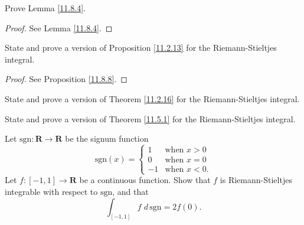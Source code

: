 \exercisesection

\begin{exercise}\label{ex 11.8.1}
    Prove Lemma \ref{11.8.4}.
\end{exercise}

\begin{proof}
    See Lemma \ref{11.8.4}.
\end{proof}

\begin{exercise}\label{ex 11.8.2}
    State and prove a version of Proposition \ref{11.2.13} for the Riemann-Stieltjes integral.
\end{exercise}

\begin{proof}
    See Proposition \ref{11.8.8}.
\end{proof}

\begin{exercise}\label{ex 11.8.3}
    State and prove a version of Theorem \ref{11.2.16} for the Riemann-Stieltjes integral.
\end{exercise}

\begin{exercise}\label{ex 11.8.4}
    State and prove a version of Theorem \ref{11.5.1} for the Riemann-Stieltjes integral.
\end{exercise}

\begin{exercise}\label{ex 11.8.5}
    Let \(\text{sgn} : \mathbf{R} \to \mathbf{R}\) be the signum function
    \[
        \text{sgn}(x) = \begin{cases}
            1  & \text{when } x > 0  \\
            0  & \text{when } x = 0  \\
            -1 & \text{when } x < 0.
        \end{cases}
    \]
    Let \(f : [-1, 1] \to \mathbf{R}\) be a continuous function.
    Show that \(f\) is Riemann-Stieltjes integrable with respect to \(\text{sgn}\), and that
    \[
        \int_{[-1, 1]} f \; d \, \text{sgn} = 2f(0).
    \]
\end{exercise}
